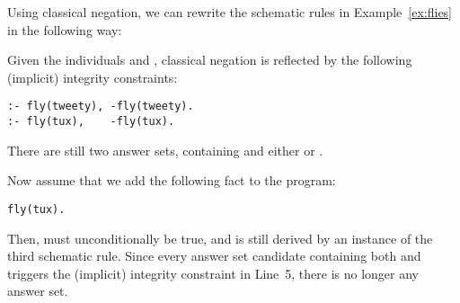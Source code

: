 \begin{example}\label{ex:flies:neg}
Using classical negation,
we can rewrite the schematic rules in Example~\ref{ex:flies}
in the following way:
%

%
Given the individuals  and ,
classical negation is reflected by
the following (implicit) integrity constraints:%
%
\begin{lstlisting}[firstnumber=4]
:- fly(tweety), -fly(tweety).
:- fly(tux),    -fly(tux).
\end{lstlisting}
There are still two answer sets,
containing  and
either  or .

Now assume that we add the following fact to the program:
\begin{lstlisting}[numbers=none]
fly(tux).
\end{lstlisting}
Then,
 must unconditionally be true,
and  is still derived by
an instance of the third schematic rule.
Since every answer set candidate containing
both  and 
triggers
the (implicit) integrity constraint in Line~5,
there is no longer any answer set.
\end{example}

